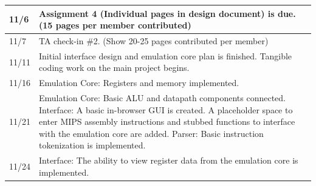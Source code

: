 \documentclass[
    paper=letter,
    parskip=half,
    fontsize=12pt,
    titlepage=firstiscover,
    toc=bibliography,
    numbers=endperiod
]{scrartcl}
\begin{document}
{\begin{tabularx}{\textwidth}{|l|X|}
        11/6          & Assignment 4 (Individual pages in design document) is due. (15 pages per member contributed)                                                                                                                                                                                                                                                                                                                                         \\\hline
        11/7          & TA check-in \#2. (Show 20-25 pages contributed per member)                                                                                                                                                                                                                                                                                                                                                                           \\\hline
        11/11         & Initial interface design and emulation core plan is finished. Tangible coding work on the main project begins.                                                                                                                                                                                                                                                                                                                       \\\hline
        11/16         & Emulation Core: Registers and memory implemented.                                                                                                                                                                                                                                                                                                                                                                                    \\\hline
        11/21         & Emulation Core: Basic ALU and datapath components connected. \newline Interface: A basic in-browser GUI is created. A placeholder space to enter MIPS assembly instructions and stubbed functions to interface with the emulation core are added. \newline Parser: Basic instruction tokenization is implemented.                                                                                                                    \\\hline
        11/24         & Interface: The ability to view register data from the emulation core is implemented.                                                                                                                                                                                                                                                                                                                                                 \\\hline

\end{tabularx}}
\end{document}
